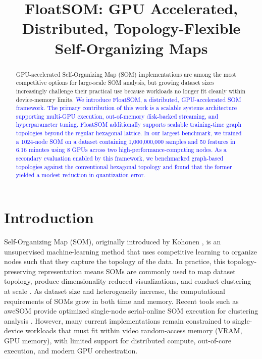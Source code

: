 \documentclass[10pt]{article} %
\title{FloatSOM: GPU Accelerated, Distributed, Topology-Flexible Self-Organizing Maps}
\author{}
\newcommand{\TrackedChange}[1]{\textcolor{blue}{#1}}
\begin{document}
\maketitle

\begin{abstract}
GPU-accelerated Self-Organizing Map (SOM) implementations are among the most competitive options for large-scale SOM analysis, but growing dataset sizes increasingly challenge their practical use because workloads no longer fit cleanly within device-memory limits. \TrackedChange{We introduce FloatSOM, a distributed, GPU-accelerated SOM framework. The primary contribution of this work is a scalable systems architecture supporting multi-GPU execution, out-of-memory disk-backed streaming, and hyperparameter tuning. FloatSOM additionally supports scalable training-time graph topologies beyond the regular hexagonal lattice.} \TrackedChange{In our largest benchmark, we trained a 1024-node SOM on a dataset containing 1,000,000,000 samples and 50 features in 6.16 minutes using 8 GPUs across two high-performance-computing nodes.} \TrackedChange{As a secondary evaluation enabled by this framework, we benchmarked graph-based topologies against the conventional hexagonal topology and found that the former yielded a modest reduction in quantization error.}
\end{abstract}

\section{Introduction}

Self-Organizing Map (SOM), originally introduced by Kohonen \citep{kohonenSelforganizingMap1990}, is an unsupervised machine-learning method that uses competitive learning to organize nodes such that they capture the topology of the data. In practice, this topology-preserving representation means SOMs are commonly used to map dataset topology, produce dimensionality-reduced visualizations, and conduct clustering at scale \citep{kangasVariantsSelforganizingMaps1990}. As dataset size and heterogeneity increase, the computational requirements of SOMs grow in both time and memory. Recent tools such as aweSOM provide optimized single-node serial-online SOM execution for clustering analysis \citep{haAweSOMCPUGPUaccelerated2025}. However, many current implementations remain constrained to single-device workloads that must fit within video random-access memory (VRAM, GPU memory), with limited support for distributed compute, out-of-core execution, and modern GPU orchestration.
\end{document}

